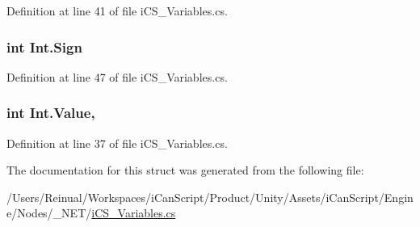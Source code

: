 Definition at line 41 of file i\+C\+S\+\_\+\+Variables.\+cs.

\hypertarget{struct_int_a416e1f5855334378912b031378f5fb26}{
\subsubsection[{Sign}]{\setlength{\rightskip}{0pt plus 5cm}int Int.\+Sign\hspace{0.3cm}{\ttfamily [get]}}}\label{struct_int_a416e1f5855334378912b031378f5fb26}


Definition at line 47 of file i\+C\+S\+\_\+\+Variables.\+cs.

\hypertarget{struct_int_a5e3cbaf337232bde68fe94225f01b46c}{
\subsubsection[{Value}]{\setlength{\rightskip}{0pt plus 5cm}int Int.\+Value\hspace{0.3cm}{\ttfamily [get]}, {\ttfamily [set]}}}\label{struct_int_a5e3cbaf337232bde68fe94225f01b46c}


Definition at line 37 of file i\+C\+S\+\_\+\+Variables.\+cs.



The documentation for this struct was generated from the following file\+:\begin{DoxyCompactItemize}
\item 
/\+Users/\+Reinual/\+Workspaces/i\+Can\+Script/\+Product/\+Unity/\+Assets/i\+Can\+Script/\+Engine/\+Nodes/\+\_\+\+N\+E\+T/\hyperlink{i_c_s___variables_8cs}{i\+C\+S\+\_\+\+Variables.\+cs}\end{DoxyCompactItemize}
